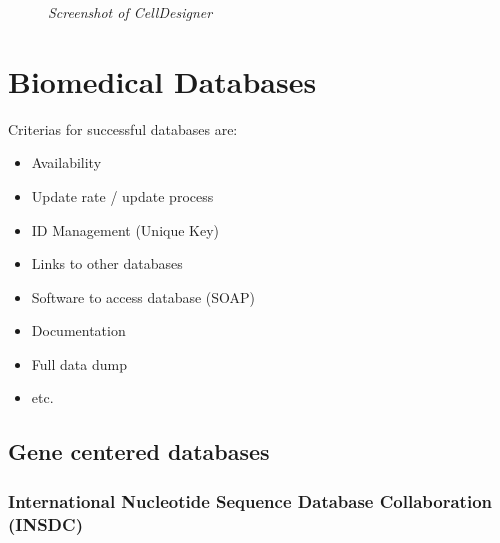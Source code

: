 \begin{figure}[ht]
\centering
{} 
\caption[Screenshot of CellDesigner]{\textit{Screenshot of CellDesigner}} 
\label{gfx:screenshot_cell_designer}
\end{figure}

\section{Biomedical Databases}

Criterias for successful databases are: 
\begin{itemize}
 \item Availability
 \item Update rate / update process
 \item ID Management (Unique Key)
 \item Links to other databases
 \item Software to access database (SOAP)
 \item Documentation
 \item Full data dump 
 \item etc.
\end{itemize}

\subsection{Gene centered databases}

\subsubsection{International Nucleotide Sequence Database Collaboration (INSDC)}

